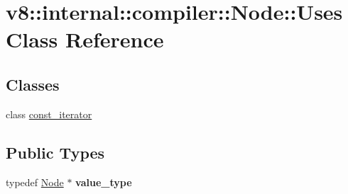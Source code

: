\hypertarget{classv8_1_1internal_1_1compiler_1_1_node_1_1_uses}{}\section{v8\+:\+:internal\+:\+:compiler\+:\+:Node\+:\+:Uses Class Reference}
\label{classv8_1_1internal_1_1compiler_1_1_node_1_1_uses}
\subsection*{Classes}
\begin{DoxyCompactItemize}
\item 
class \hyperlink{classv8_1_1internal_1_1compiler_1_1_node_1_1_uses_1_1const__iterator}{const\+\_\+iterator}
\end{DoxyCompactItemize}
\subsection*{Public Types}
\begin{DoxyCompactItemize}
\item 
typedef \hyperlink{classv8_1_1internal_1_1compiler_1_1_node}{Node} $\ast$ {\bfseries value\+\_\+type}\hypertarget{classv8_1_1internal_1_1compiler_1_1_node_1_1_uses_a465033ad0ca06883e34e1e3a12a13666}{}\label{classv8_1_1internal_1_1compiler_1_1_node_1_1_uses_a465033ad0ca06883e34e1e3a12a13666}

\end{DoxyCompactItemize}
